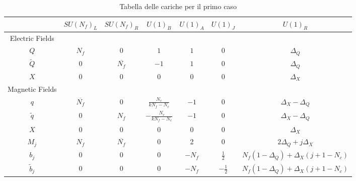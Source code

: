\documentclass[a4paper,12pt]{article}
\begin{document}
\begin{table} [hb]
\centering
\begin{tabular}{|c |c |c |c |c |c |c |}
\hline
 & $SU(N_f)_L$ & $SU(N_f)_R$ & $U(1)_B$ & $U(1)_A$ & $U(1)_J$ & $U(1)_R $ \\
\hline
 Electric Fields  & & & & & & \\
\hline
$Q$ & $N_f$ & 0  &$ 1 $& $1 $& 0  & $\Delta_Q$ \\
$\tilde{Q} $  & 0  &$\overline{N_f}$ & $ - 1$& $1 $ & 0 & $\Delta_Q$ \\
$X$ & 0 & 0 & 0 & 0 &0 & $\Delta_X$ \\
\hline
Magnetic Fields & & & & & & \\
\hline
$q$ & $\overline{N_f}$ & 0  & $\frac{N_c}{k N_f - N_c} $ & $-1 $ & 0  & $\Delta_X - \Delta_Q$ \\
$\tilde{q} $  & 0  &$N_f$ & $-\frac{N_c}{k N_f - N_c}$ & $- 1 $ & 0 &$\Delta_X - \Delta_Q$ \\
$X$ & 0 & 0 & 0 & 0 &0 & $\Delta_X$ \\
$M_j $ & $N_f$ & $\overline{N_f}$ & 0 & 2 & 0 & $2 \Delta_Q + j \Delta_X$\\
$b_j$ & 0  & 0 & 0  &  $ -N_f$ & $ \frac{1}{2}$   & $N_f ( 1 - \Delta_Q) + \Delta_X (j +1  - N_c) $ \\
 $\tilde{b} _j$ & 0  & 0 & 0  &  $ - N_f$ & $ - \frac{1}{2}$   & $N_f ( 1 - \Delta_Q) + \Delta_X (j +1 - N_c) $ \\
\hline
\end{tabular}
\caption{Tabella delle cariche per il primo caso}
\end{table}
\end{document}
